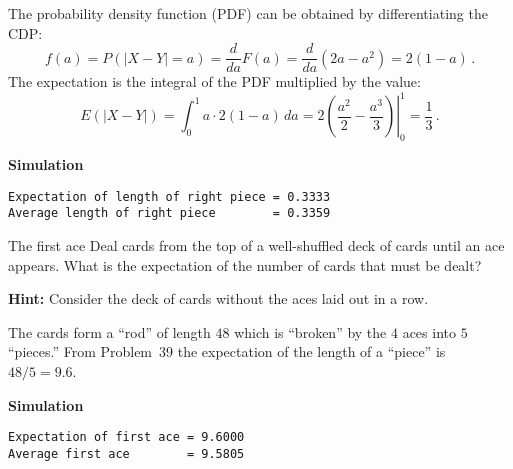 The probability density function (PDF) can be obtained by differentiating the CDP:
\[
f(a)=P(|X-Y|=a)= \frac{d}{da}F(a) =
  \frac{d}{da}(2a-a^2)=2(1-a)\,.
\]
The expectation is the integral of the PDF multiplied by the value:
\[
E(|X-Y|)= \int_{0}^{1} a\cdot2(1-a)\, da=
  2\left.\left(\frac{a^2}{2}-\frac{a^3}{3}\right)\right|_0^1=\frac{1}{3}\,.
\]

\textbf{Simulation}
\begin{verbatim}
Expectation of length of right piece = 0.3333
Average length of right piece        = 0.3359
\end{verbatim}


\begin{prob}{The first ace}
Deal cards from the top of a well-shuffled deck of cards until an ace appears. What is the expectation of the number of cards that must be dealt?

\textbf{Hint:} Consider the deck of cards without the aces laid out in a row.
\end{prob}

\solution{}

The cards form a ``rod'' of length $48$ which is ``broken'' by the $4$ aces into $5$ ``pieces.'' From Problem~39 the expectation of the length of a ``piece'' is $48/5=9.6$.

\textbf{Simulation}
\begin{verbatim}
Expectation of first ace = 9.6000
Average first ace        = 9.5805
\end{verbatim}

